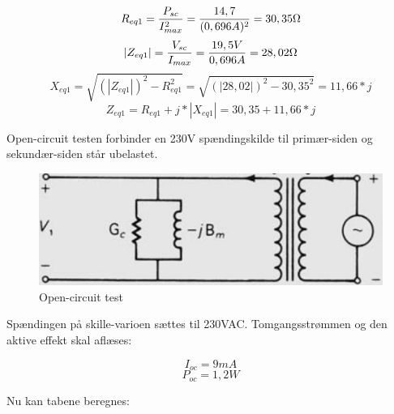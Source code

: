\begin{equation}
	R_{eq1} = \frac{P_{sc}}{I_{max}^2} = \frac{14,7}{(0,696A)^2} = 30,35\ohm
\end{equation}
\begin{equation}
	\left|Z_{eq1}\right| = \frac{V_{sc}}{I_{max}} = \frac{19,5V}{0,696A} = 28,02\ohm
\end{equation}
\begin{equation}
	X_{eq1} = \sqrt{\left(\left|Z_{eq1}\right|\right)^2 - R_{eq1}^2} = \sqrt{\left(\left|28,02\right|\right)^2 - 30,35^2} = 11,66 * j
\end{equation}
\begin{equation}
	Z_{eq1} = R_{eq1} + j * \left|X_{eq1}\right| = 30,35 + 11,66 * j
\end{equation}

Open-circuit testen forbinder en 230V spændingskilde til primær-siden og sekundær-siden står ubelastet.

\begin{figure}[H]
	\centering
	\includegraphics[scale=0.25]{../Hardware/PSU/Transformer/OpenCircuit}
	\caption{Open-circuit test}
	\label{photo:OpenCircuit}
\end{figure}


Spændingen på skille-varioen sættes til 230VAC. Tomgangsstrømmen og den aktive effekt skal aflæses:

\begin{equation}
	I_{oc} = 9mA
\end{equation}
\begin{equation}
	P_{oc} = 1,2W
\end{equation}

Nu kan tabene beregnes:

